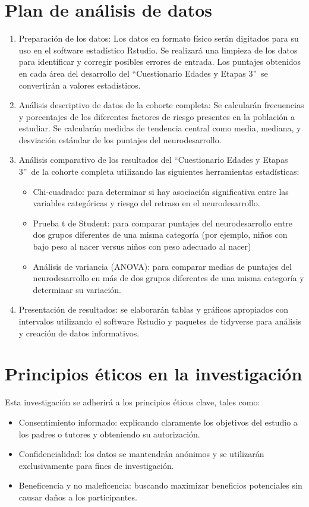 \documentclass[11pt,letterpaper]{report}
\newcommand{\asq}{“Cuestionario Edades y Etapas 3”}
\begin{document}
\section{Plan de análisis de datos}
\begin{enumerate}
	\item Preparación de los datos: Los datos en formato físico serán
	digitados para su uso en el software estadístico Rstudio. Se realizará una
	limpieza de los datos para identificar y corregir posibles errores de
	entrada. Los puntajes obtenidos en cada área del desarrollo del \asq\ se
	convertirán a valores estadísticos. 
	
	\item Análisis descriptivo de datos de la cohorte completa: Se calcularán
	frecuencias y porcentajes de los diferentes factores de riesgo presentes en
	la población a estudiar. Se calcularán medidas de tendencia central como
	media, mediana, y desviación estándar de los puntajes del neurodesarrollo.

	\item Análisis comparativo de los resultados del \asq\ de la cohorte
	completa utilizando las siguientes herramientas estadísticas:
		\begin{itemize}
		\item Chi-cuadrado: para determinar si hay asociación significativa
		entre las variables categóricas y riesgo del retraso en el
		neurodesarrollo.
		\item Prueba t de Student: para comparar puntajes del neurodesarrollo
		entre dos grupos diferentes de una misma categoría (por ejemplo, niños
		con bajo peso al nacer versus niños con peso adecuado al nacer)
		\item Análisis de variancia (ANOVA): para comparar medias de puntajes
		del neurodesarrollo en más de dos grupos diferentes de una misma
		categoría y determinar su variación.
		\end{itemize}
	
	\item Presentación de resultados: se elaborarán tablas y gráficos
	apropiados con intervalos utilizando el software Rstudio y paquetes de
	tidyverse para análisis y creación de datos informativos.
\end{enumerate}

\section{Principios éticos en la investigación}
Esta investigación se adherirá a los principios éticos clave, tales como:
\begin{itemize}
	\item Consentimiento informado: explicando claramente los objetivos del
	estudio a los padres o tutores y obteniendo su autorización.

	\item Confidencialidad: los datos se mantendrán anónimos y se utilizarán 
	exclusivamente para fines de investigación.

	\item Beneficencia y no maleficencia: buscando maximizar beneficios
	potenciales sin causar daños a los participantes.
\end{itemize}
\end{document}
